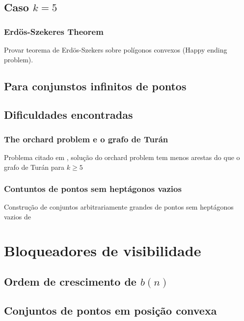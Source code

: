 \documentclass[a4paper]{book}
\begin{document}
\section{Caso $k=5$}
\subsection{Erdös-Szekeres Theorem}
Provar teorema de Erdös-Szekers sobre polígonos convexos (Happy ending problem).
\cite{pentagon}
\section{Para conjunstos infinitos de pontos}
\cite{infinity}
\section{Dificuldades encontradas}
\subsection{The orchard problem e o grafo de Turán}
Problema citado em \cite{visblock}, solução do orchard problem tem menos arestas do que o grafo de Turán para $k\geq 5$

\subsection{Contuntos de pontos sem heptágonos vazios}
Construção de conjuntos arbitrariamente grandes de pontos sem heptágonos vazios de \cite{heptagon}

\chapter{Bloqueadores de visibilidade}

\section{Ordem de crescimento de $b(n)$}
\cite{block,blockers}

\section{Conjuntos de pontos em posição convexa}
\cite{block,blockers}



{}
\end{document}
